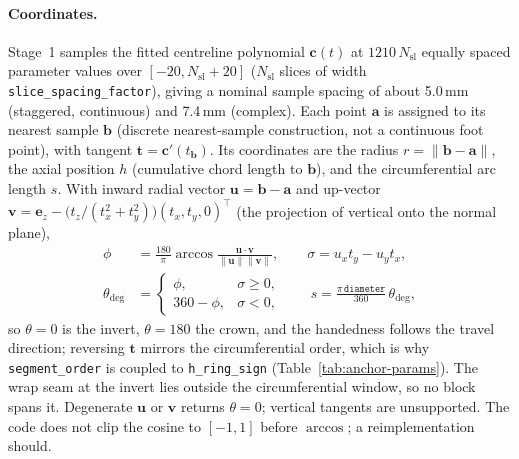 \documentclass[a4paper,fleqn]{cas-dc}
\begin{document}
\paragraph{Coordinates.}
Stage~1 samples the fitted centreline polynomial $\mathbf c(t)$ at $1210\,N_{\mathrm{sl}}$ equally spaced parameter values over $[-20,N_{\mathrm{sl}}+20]$ ($N_{\mathrm{sl}}$ slices of width \texttt{slice\_spacing\_factor}), giving a nominal sample spacing of about 5.0\,mm (staggered, continuous) and 7.4\,mm (complex). Each point $\mathbf a$ is assigned to its nearest sample $\mathbf b$ (discrete nearest-sample construction, not a continuous foot point), with tangent $\mathbf t=\mathbf c'(t_{\mathbf b})$. Its coordinates are the radius $r=\lVert\mathbf b-\mathbf a\rVert$, the axial position $h$ (cumulative chord length to $\mathbf b$), and the circumferential arc length $s$. With inward radial vector $\mathbf u=\mathbf b-\mathbf a$ and up-vector $\mathbf v=\mathbf e_z-\bigl(t_z/(t_x^2+t_y^2)\bigr)(t_x,t_y,0)^{\top}$ (the projection of vertical onto the normal plane),
\begin{equation}
\begin{aligned}
\phi&=\frac{180}{\pi}\arccos\frac{\mathbf u\cdot\mathbf v}{\lVert\mathbf u\rVert\lVert\mathbf v\rVert},\qquad
\sigma=u_xt_y-u_yt_x,\\
\theta_{\mathrm{deg}}&=\begin{cases}\phi,&\sigma\ge0,\\360-\phi,&\sigma<0,\end{cases}\qquad
s=\frac{\pi\,\texttt{diameter}}{360}\,\theta_{\mathrm{deg}},
\end{aligned}
\label{eq:theta-convention}
\end{equation}
so $\theta=0$ is the invert, $\theta=180$ the crown, and the handedness follows the travel direction; reversing $\mathbf t$ mirrors the circumferential order, which is why \texttt{segment\_order} is coupled to \texttt{h\_ring\_sign} (Table~\ref{tab:anchor-params}). The wrap seam at the invert lies outside the circumferential window, so no block spans it. Degenerate $\mathbf u$ or $\mathbf v$ returns $\theta=0$; vertical tangents are unsupported. The code does not clip the cosine to $[-1,1]$ before $\arccos$; a reimplementation should.
\end{document}

